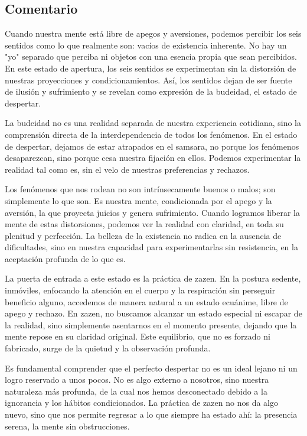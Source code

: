 \documentclass[
  a5paperpaper,
]{article}
\begin{document}
\hfill\break

\hypertarget{comentario-38}{%
\subsection{Comentario}\label{comentario-38}}

Cuando nuestra mente está libre de apegos y aversiones, podemos percibir
los seis sentidos como lo que realmente son: vacíos de existencia
inherente. No hay un "yo" separado que perciba ni objetos con una
esencia propia que sean percibidos. En este estado de apertura, los seis
sentidos se experimentan sin la distorsión de nuestras proyecciones y
condicionamientos. Así, los sentidos dejan de ser fuente de ilusión y
sufrimiento y se revelan como expresión de la budeidad, el estado de
despertar.

La budeidad no es una realidad separada de nuestra experiencia
cotidiana, sino la comprensión directa de la interdependencia de todos
los fenómenos. En el estado de despertar, dejamos de estar atrapados en
el samsara, no porque los fenómenos desaparezcan, sino porque cesa
nuestra fijación en ellos. Podemos experimentar la realidad tal como es,
sin el velo de nuestras preferencias y rechazos.

Los fenómenos que nos rodean no son intrínsecamente buenos o malos; son
simplemente lo que son. Es nuestra mente, condicionada por el apego y la
aversión, la que proyecta juicios y genera sufrimiento. Cuando logramos
liberar la mente de estas distorsiones, podemos ver la realidad con
claridad, en toda su plenitud y perfección. La belleza de la existencia
no radica en la ausencia de dificultades, sino en nuestra capacidad para
experimentarlas sin resistencia, en la aceptación profunda de lo que es.

La puerta de entrada a este estado es la práctica de zazen. En la
postura sedente, inmóviles, enfocando la atención en el cuerpo y la
respiración sin perseguir beneficio alguno, accedemos de manera natural
a un estado ecuánime, libre de apego y rechazo. En zazen, no buscamos
alcanzar un estado especial ni escapar de la realidad, sino simplemente
asentarnos en el momento presente, dejando que la mente repose en su
claridad original. Este equilibrio, que no es forzado ni fabricado,
surge de la quietud y la observación profunda.

Es fundamental comprender que el perfecto despertar no es un ideal
lejano ni un logro reservado a unos pocos. No es algo externo a
nosotros, sino nuestra naturaleza más profunda, de la cual nos hemos
desconectado debido a la ignorancia y los hábitos condicionados. La
práctica de zazen no nos da algo nuevo, sino que nos permite regresar a
lo que siempre ha estado ahí: la presencia serena, la mente sin
obstrucciones.
\end{document}
